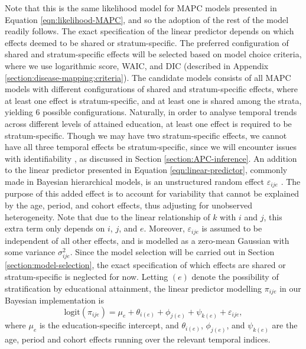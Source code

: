 Note that this is the same likelihood model for MAPC models presented in Equation \eqref{eqn:likelihood-MAPC}, and so the adoption of the rest of the model readily follows. The exact specification of the linear predictor depends on which effects deemed to be shared or stratum-specific. The preferred configuration of shared and stratum-specific effects will be selected based on model choice criteria, where we use logarithmic score, WAIC, and DIC (described in Appendix \ref{section:disease-mapping:criteria}). The candidate models consists of all MAPC models with different configurations of shared and stratum-specific effects, where at least one effect is stratum-specific, and at least one is shared among the strata, yielding $6$ possible configurations. Naturally, in order to analyse temporal trends across different levels of attained education, at least one effect is required to be stratum-specific. Though we may have two stratum-specific effects, we cannot have all three temporal effects be stratum-specific, since we will encounter issues with identifiability \citep{APC-Bayesian-Andrea}, as discussed in Section \ref{section:APC-inference}. An addition to the linear predictor presented in Equation \eqref{eqn:linear-predictor}, commonly made in Bayesian hierarchical models, is an unstructured random effect $\varepsilon_{ije}$ \citep{APC-Bayesian-Andrea}. The purpose of this added effect is to account for variability that cannot be explained by the age, period, and cohort effects, thus adjusting for unobserved heterogeneity. Note that due to the linear relationship of $k$ with $i$ and $j$, this extra term only depends on $i$, $j$, and $e$. Moreover, $\varepsilon_{ije}$ is assumed to be independent of all other effects, and is modelled as a zero-mean Gaussian with some variance $\sigma^2_{ije}$. Since the model selection will be carried out in Section \ref{section:model-selection}, the exact specification of which effects are shared or stratum-specific is neglected for now. Letting $(e)$ denote the possibility of stratification by educational attainment, the linear predictor modelling $\pi_{ije}$ in our Bayesian implementation is
\begin{equation}
    \text{logit}(\pi_{ije}) = \mu_{e} + \theta_{i(e)} + \phi_{j(e)} + \psi_{k(e)} + \varepsilon_{ije},
    \label{eqn:linear-pred}
\end{equation}
where $\mu_e$ is the education-specific intercept, and $\theta_{i(e)}$, $\phi_{j(e)}$, and $\psi_{k(e)}$ are the age, period and cohort effects running over the relevant temporal indices.


